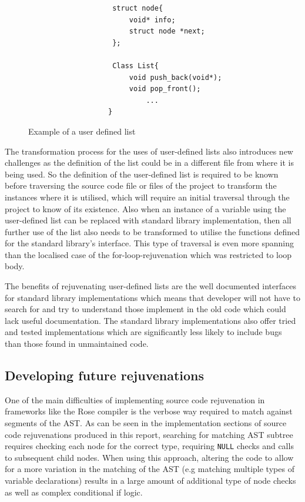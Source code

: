 \documentclass[bsc,frontabs,singlespacing,twoside,parskip,deptreport]{infthesis}
\begin{document}
\begin{figure}[htb]
    \centering
    \begin{verbatim}
                    struct node{
                        void* info;
                        struct node *next;
                    };
                    
                    Class List{
                        void push_back(void*);
                        void pop_front();
                            ...
                   }
    \end{verbatim}
    \caption{Example of a user defined list}
    \label{fig:user-def-list}
\end{figure}

The transformation process for the uses of user-defined lists also introduces new challenges as the definition of the list could be in a different file from where it is being used. So the definition of the user-defined list is required to be known before traversing the source code file or files of the project to transform the instances where it is utilised, which will require an initial traversal through the project to know of its existence. Also when an instance of a variable using the user-defined list can be replaced with standard library implementation, then all further use of the list also needs to be transformed to utilise the functions defined for the standard library's interface. This type of traversal is even more spanning than the localised case of the for-loop-rejuvenation which was restricted to loop body.

The benefits of rejuvenating user-defined lists are the well documented interfaces for standard library implementations which means that developer will not have to search for and try to understand those implement in the old code which could lack useful documentation. The standard library implementations also offer tried and tested implementations which are significantly less likely to include bugs than those found in unmaintained code.

\subsection{Developing future rejuvenations}

One of the main difficulties of implementing source code rejuvenation in frameworks like the Rose compiler is the verbose way required to match against segments of the AST. As can be seen in the implementation sections of source code rejuvenations produced in this report, searching for matching AST subtree requires checking each node for the correct type, requiring \texttt{NULL} checks and calls to subsequent child nodes. When using this approach, altering the code to allow for a more variation in the matching of the AST (e.g matching multiple types of variable declarations) results in a large amount of additional type of node checks as well as complex conditional if logic. 
\end{document}
